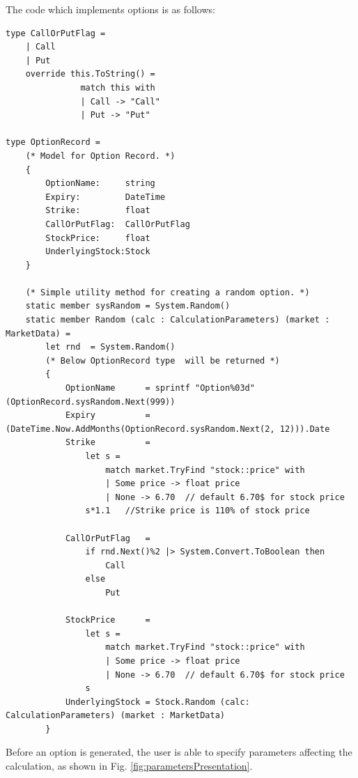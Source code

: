     The code which implements options is as follows:
    \begin{lstlisting}[label={lst:option}, caption=F\# implementation of an option.]
type CallOrPutFlag =
    | Call
    | Put
    override this.ToString() =
               match this with
               | Call -> "Call"
               | Put -> "Put"
               
type OptionRecord =
    (* Model for Option Record. *)
    {
        OptionName:     string
        Expiry:         DateTime
        Strike:         float
        CallOrPutFlag:  CallOrPutFlag
        StockPrice:     float
        UnderlyingStock:Stock
    }

    (* Simple utility method for creating a random option. *)
    static member sysRandom = System.Random()
    static member Random (calc : CalculationParameters) (market : MarketData) =
        let rnd  = System.Random()
        (* Below OptionRecord type  will be returned *)
        {
            OptionName      = sprintf "Option%03d" (OptionRecord.sysRandom.Next(999))
            Expiry          = (DateTime.Now.AddMonths(OptionRecord.sysRandom.Next(2, 12))).Date
            Strike          =
                let s =
                    match market.TryFind "stock::price" with
                    | Some price -> float price
                    | None -> 6.70  // default 6.70$ for stock price
                s*1.1   //Strike price is 110% of stock price
            
            CallOrPutFlag   = 
                if rnd.Next()%2 |> System.Convert.ToBoolean then
                    Call
                else
                    Put
            
            StockPrice      =
                let s =
                    match market.TryFind "stock::price" with
                    | Some price -> float price
                    | None -> 6.70  // default 6.70$ for stock price
                s
            UnderlyingStock = Stock.Random (calc: CalculationParameters) (market : MarketData)
        }
    \end{lstlisting}
    Before an option is generated, the user is able to specify parameters affecting the calculation, as shown in Fig. \ref{fig:parametersPresentation}.
